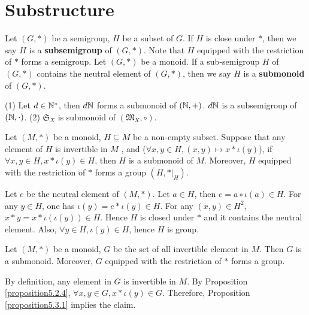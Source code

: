 \section{Substructure}
\begin{definitionenv}
    Let $(G, *)$ be a semigroup,  $H$ be a subset of $G$. If $H$ is close under $*$,  then we say $H$ is a \textbf{subsemigroup} of $(G, *)$. Note that $H$ equipped with the restriction of $*$ forms a semigroup.
    Let $(G, *)$ be a monoid. If a sub-semigroup $H$ of $(G, *)$ contains the neutral element of $(G, *)$,  then we say $H$ is a \textbf{submonoid} of $(G, *)$.
\end{definitionenv}
\begin{exampleenv}
   \quad
   \newline
   (1) Let $d\in \mathbb{N}^*$,  then $d\mathbb{N}$ forms a submonoid of $(\mathbb{N}, +)$.
   $d\mathbb{N}$ is a subsemigroup of $(\mathbb{N}, \cdot)$.
    \newline
    (2) $\mathfrak{S} _X$ is submonoid of $(\mathfrak{M} _X, \circ)$.
\end{exampleenv}
\begin{propositionenv}\label{proposition5.3.1}
    Let $(M, *)$ be a monoid,  $H\subseteq M$ be a non-empty subset. Suppose that any element of $H$ is invertible in $M$ ,  and ($\forall x, y \in H, (x, y)\mapsto x*\iota(y)$),  if $\forall x, y\in H,  x*\iota(y)\in H$,  then $H$ is a submonoid of $M$. Moreover,  $H$ equipped with the restriction of $*$ forms a group $(H, *|_H)$. 
\end{propositionenv}
\begin{proofenv}
    Let $e$ be the neutral element of $(M, *)$. Let $a\in H$,  then $e=a\circ\iota(a)\in H$. For any $y\in H$,  one has $\iota(y)=e*\iota(y)\in H$. For any $(x, y)\in H^2$,  $x*y=x*\iota(\iota(y))\in H$. Hence $H$ is closed under $*$ and it contains the neutral element. Also,  $\forall y\in H,  \iota(y)\in H$,  hence $H$ is group. 
\end{proofenv}
\begin{corollaryenv}
    Let $(M, *)$ be a monoid,  $G$ be the set of all invertible element in $M$. Then $G$ is a submonoid. Moreover,  $G$ equipped with the restriction of $*$ forms a group.
\end{corollaryenv}
\begin{proofenv}
    By definition,  any element in $G$ is invertible in $M$. By Proposition \ref{proposition5.2.4},  $\forall x, y\in G,  x*\iota(y)\in G$. Therefore,  Proposition \ref{proposition5.3.1} implies the claim.
\end{proofenv}
